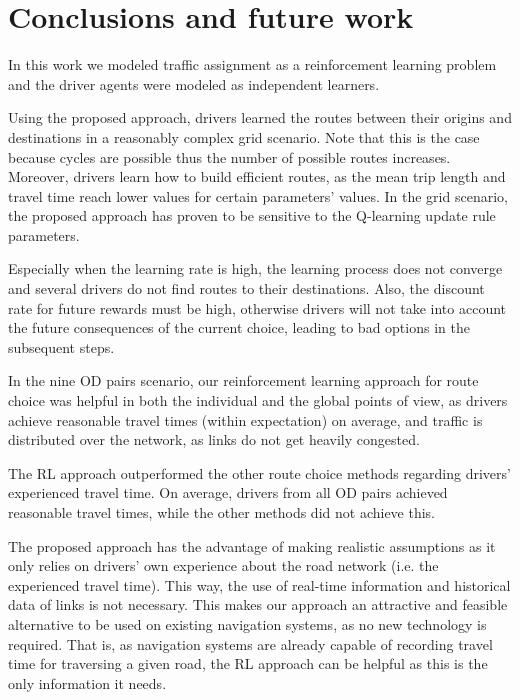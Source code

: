 \documentclass{RITA}
\begin{document}
\section{Conclusions and future work}
\label{sec:conclusions}

In this work we modeled traffic assignment as a reinforcement learning problem and the driver agents were modeled as independent learners.

Using the proposed approach, drivers learned the routes between their origins and destinations in a reasonably complex grid scenario. Note that this is the case because cycles are possible thus the number of possible routes increases. Moreover, drivers learn how to build efficient routes, as the mean trip length and travel time reach lower values for certain parameters' values. In the grid scenario, the proposed approach has proven to be sensitive to the Q-learning update rule parameters. 

Especially when the learning rate is high, the learning process does not converge and several drivers do not find routes to their destinations. Also, the discount rate for future rewards must be high, otherwise drivers will not take into account the future consequences of the current choice, leading to bad options in the subsequent steps.

In the nine OD pairs scenario, our reinforcement learning approach for route choice was helpful in both the individual and the global points of view, as drivers achieve reasonable travel times (within expectation) on average, and traffic is distributed over the network, as links do not get heavily congested.

The RL approach outperformed the other route choice methods regarding drivers' experienced travel time. On average, drivers from all OD pairs achieved reasonable travel times, while the other methods did not achieve this.


The proposed approach has the advantage of making realistic assumptions as it only relies on drivers' own experience about the road network (i.e. the experienced travel time). This way, the use of real-time information and historical data of links is not necessary. This makes our approach an attractive and feasible alternative to be used on existing navigation systems, as no new technology is required. That is, as navigation systems are already capable of recording travel time for traversing a given road, the RL approach can be helpful as this is the only information it needs.
\end{document}
